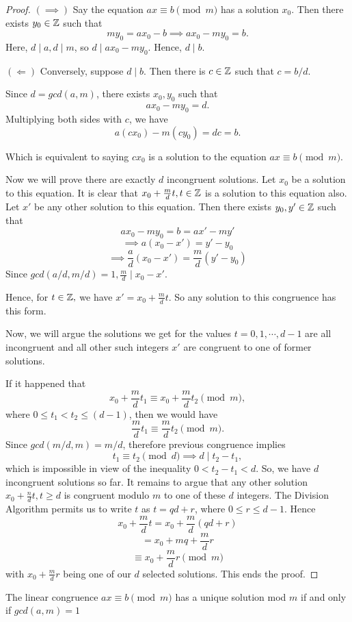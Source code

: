 \begin{proof}
    $(\implies)$ Say the equation $ax \equiv b \pmod{m}$ has a solution $x_0$. Then there exists $y_0 \in \mathbb{Z}$ such that \[my_0 = ax_0 - b \implies ax_0 - my_0 = b.\] 
    Here, $d \mid a, d \mid m$, so $d \mid ax_0 - my_0.$ Hence, $d \mid b$.

    $(\Leftarrow)$ Conversely, suppose $d \mid b$. Then there is $c \in \mathbb{Z}$ such that $c = b/d$.

    Since $d = gcd(a, m)$, there exists $x_0, y_0$ such that \[ax_0 - my_0 = d.\] Multiplying both sides with $c$, we have \[a(cx_0) - m(cy_0) = dc = b.\]

    Which is equivalent to saying $cx_0$ is a solution to the equation $ax \equiv b \pmod{m}$.

    Now we will prove there are exactly $d$ incongruent solutions. Let $x_0$ be a solution to this equation. It is clear that $x_0 + \frac{m}{d}t, t \in \mathbb{Z}$ is a solution to this equation also. Let $x'$ be any other solution to this equation. Then there exists $y_0, y' \in \mathbb{Z}$ such that 
    \[
        ax_0 - my_0 = b = ax' - my'
    \]
    \[
        \implies a(x_0 - x') = y'-y_0
    \]
    \[
        \implies \frac{a}{d}(x_0 - x') = \frac{m}{d}(y'-y_0)
    \]
    Since $gcd(a/d, m/d) = 1, \frac{m}{d} \mid x_0 - x'$.

    Hence, for $t \in \mathbb{Z},$ we have $x' = x_0 + \frac{m}{d}t$. So any solution to this congruence has this form.

    Now, we will argue the solutions we get for the values $t = 0, 1, \cdots, d-1$ are all incongruent and all other such integers $x'$ are congruent to one of former solutions.

    If it happened that 
    \[x_0 + \frac{m}{d}t_1 \equiv x_0 + \frac{m}{d}t_2 \pmod{m},\]
    where $0 \le t_1 < t_2 \le (d-1)$, then we would have 
    \[\frac{m}{d}t_1 \equiv \frac{m}{d}t_2 \pmod{m}.\]
    Since $gcd(m/d, m) = m/d$, therefore previous congruence implies 
    \[t_1 \equiv t_2 \pmod{d} \implies d \mid t_2 - t_1,\]
    which is impossible in view of the inequality $0 < t_2 - t_1 < d$. So, we have $d$ incongruent solutions so far. It remains to argue that any other solution \( x_0 + \frac{n}{d} t, t \ge d \) is congruent modulo \( m \) to
one of these \( d \) integers. The Division Algorithm permits us to write \( t \) as
\( t = qd + r \), where \( 0 \leq r \leq d - 1 \). Hence
$$
x_0 + \frac{m}{d} t = x_0 + \frac{m}{d} (qd + r)
$$
$$
= x_0 + mq + \frac{m}{d} r
$$
$$
\equiv x_0 + \frac{m}{d} r \pmod{m}
$$
with \( x_0 + \frac{m}{d} r \) being one of our \( d \) selected solutions. This ends the proof.
\end{proof}
\begin{corollary}\label{thm:uniquecong}
    The linear congruence $ax \equiv b \pmod{m}$ has a unique solution mod $m$ if and only if  $gcd(a, m) = 1$
\end{corollary}


